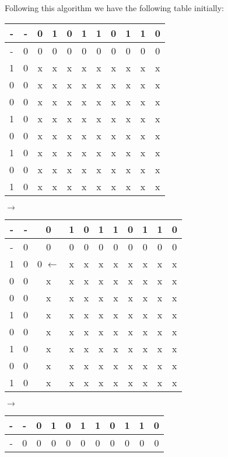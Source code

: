 \documentclass[11pt]{article}
\begin{document}
\begin{enumerate}
    Following this algorithm we have the following table initially:
    \\
    \begin{tabular}{ c | c c c c c c c c c c } 
        - & - & 0 & 1 & 0 & 1 & 1 & 0 & 1 & 1 & 0 \\
        \hline
        - & 0 & 0 & 0 & 0 & 0 & 0 & 0 & 0 & 0 & 0 \\
        1 & 0 & x & x & x & x & x & x & x & x & x \\
        0 & 0 & x & x & x & x & x & x & x & x & x \\
        0 & 0 & x & x & x & x & x & x & x & x & x \\
        1 & 0 & x & x & x & x & x & x & x & x & x \\
        0 & 0 & x & x & x & x & x & x & x & x & x \\
        1 & 0 & x & x & x & x & x & x & x & x & x \\
        0 & 0 & x & x & x & x & x & x & x & x & x \\
        1 & 0 & x & x & x & x & x & x & x & x & x \\
    \end{tabular}
    $\rightarrow$
    \begin{tabular}{ c | c c c c c c c c c c } 
        - & - & 0 & 1 & 0 & 1 & 1 & 0 & 1 & 1 & 0 \\
        \hline
        - & 0 & 0 & 0 & 0 & 0 & 0 & 0 & 0 & 0 & 0 \\
        1 & 0 & 0 $\leftarrow$ & x & x & x & x & x & x & x & x \\
        0 & 0 & x & x & x & x & x & x & x & x & x \\
        0 & 0 & x & x & x & x & x & x & x & x & x \\
        1 & 0 & x & x & x & x & x & x & x & x & x \\
        0 & 0 & x & x & x & x & x & x & x & x & x \\
        1 & 0 & x & x & x & x & x & x & x & x & x \\
        0 & 0 & x & x & x & x & x & x & x & x & x \\
        1 & 0 & x & x & x & x & x & x & x & x & x \\
    \end{tabular}
    $\rightarrow$ \\
    \begin{tabular}{ c | c c c c c c c c c c } 
        - & - & 0 & 1 & 0 & 1 & 1 & 0 & 1 & 1 & 0 \\
        \hline
        - & 0 & 0 & 0 & 0 & 0 & 0 & 0 & 0 & 0 & 0 \\

\end{tabular}
\end{enumerate}
\end{document}
